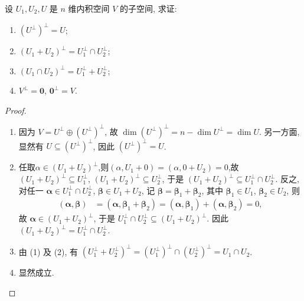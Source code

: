 \documentclass[../../main.tex]{subfiles}%
\begin{document}
\begin{proposition}\label{proposition:例9.18}
设 $U_1,U_2,U$ 是 $n$ 维内积空间 $V$ 的子空间, 求证:
\begin{enumerate}[(1)]
\item $(U^\perp)^\perp = U$;
\item $(U_1 + U_2)^\perp = U_1^\perp \cap U_2^\perp$;
\item\label{proposition:例9.18-3} $(U_1 \cap U_2)^\perp = U_1^\perp + U_2^\perp$;
\item $V^\perp = \boldsymbol{0}$, $\boldsymbol{0}^\perp = V$.
\end{enumerate}
\end{proposition}
\begin{proof}
\begin{enumerate}[(1)]
\item 因为 $V = U^\perp \oplus (U^\perp)^\perp$, 故 $\dim (U^\perp)^\perp = n - \dim U^\perp = \dim U$. 另一方面, 显然有 $U \subseteq (U^\perp)^\perp$, 因此 $(U^\perp)^\perp = U$.
\item 任取$\alpha\in (U_1+U_2)^\perp$,则$(\alpha,U_1+0)=(\alpha,0+U_2)=0 $,故$(U_1 + U_2)^\perp \subseteq U_1^\perp$, $(U_1 + U_2)^\perp \subseteq U_2^\perp$, 于是 $(U_1 + U_2)^\perp \subseteq U_1^\perp \cap U_2^\perp$. 反之, 对任一 $\boldsymbol{\alpha} \in U_1^\perp \cap U_2^\perp$, $\boldsymbol{\beta} \in U_1 + U_2$, 记 $\boldsymbol{\beta} = \boldsymbol{\beta}_1 + \boldsymbol{\beta}_2$, 其中 $\boldsymbol{\beta}_1 \in U_1$, $\boldsymbol{\beta}_2 \in U_2$, 则
\begin{align*}
(\boldsymbol{\alpha},\boldsymbol{\beta}) &= (\boldsymbol{\alpha},\boldsymbol{\beta}_1 + \boldsymbol{\beta}_2) = (\boldsymbol{\alpha},\boldsymbol{\beta}_1) + (\boldsymbol{\alpha},\boldsymbol{\beta}_2) = 0,
\end{align*}
故 $\boldsymbol{\alpha} \in (U_1 + U_2)^\perp$, 于是 $U_1^\perp \cap U_2^\perp \subseteq (U_1 + U_2)^\perp$. 因此 $(U_1 + U_2)^\perp = U_1^\perp \cap U_2^\perp$.
\item 由 (1) 及 (2), 有 $(U_1^\perp + U_2^\perp)^\perp = (U_1^\perp)^\perp \cap (U_2^\perp)^\perp = U_1 \cap U_2$.
\item 显然成立. 
\end{enumerate} 
\end{proof}
\end{document}
